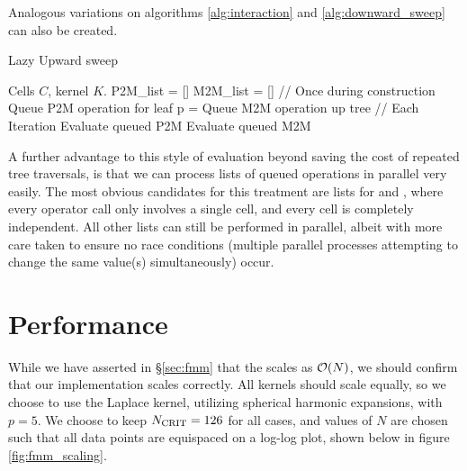 Analogous variations on algorithms \ref{alg:interaction} and \ref{alg:downward_sweep} can also be created.

\begin{algorithm}
	\caption{Lazy Upward sweep}
	\label{alg:upward_sweep_lazy}
	\begin{algorithmic}
		\Require Cells $C$, kernel $K$.
		\State P2M\_list = []
		\State M2M\_list = []
		\State // Once during construction
				\State {} \Comment Queue P2M operation for leaf
			\Else
				\State p =  \Comment Queue M2M operation up tree
				\State {}
			\EndIf
		\EndFor
		\State // Each Iteration
			\State {} \Comment Evaluate queued P2M
		\EndFor
			\State {} \Comment Evaluate queued M2M
		\EndFor
	\end{algorithmic}
\end{algorithm}

A further advantage to this style of evaluation beyond saving the cost of repeated tree traversals, is that we can process lists of queued operations in parallel very easily. The most obvious candidates for this treatment are lists for {\ptom} and {\ltop}, where every operator call only involves a single cell, and every cell is completely independent. All other lists can still be performed in parallel, albeit with more care taken to ensure no race conditions (multiple parallel processes attempting to change the same value(s) simultaneously) occur.

\section{Performance}\label{sec:fmm_performance}

While we have asserted in \S\ref{sec:fmm} that the {\fmm} scales as $\mathcal{O}(N)$, we should confirm that our implementation scales correctly. All kernels should scale equally, so we choose to use the Laplace kernel, utilizing spherical harmonic expansions, with $p = 5$. We choose to keep $N_{\text{CRIT}} = 126$ for all cases, and values of $N$ are chosen such that all data points are equispaced on a log-log plot, shown below in figure \ref{fig:fmm_scaling}.



